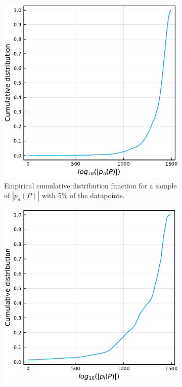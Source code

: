 \documentclass[12pt]{article}
\newcommand{\data}{d}
\newcommand{\pred}{p}
\newcommand{\paths}{P}
\theoremstyle{definition}
\begin{document}
\begin{figure}
  \centering
  \begin{subfigure}[t]{0.49\textwidth}
    \includegraphics[width=\textwidth]{figures/numpaths_measurements_cumulative.pdf}
    \caption{Empirical cumulative distribution function for a sample
      of \(|\pred_{\data}(\paths)|\) with 5\% of the datapoints.}
    \label{fig:numpaths-measurements-cumulative}
  \end{subfigure}
  \begin{subfigure}[t]{0.49\textwidth}
    \includegraphics[width=\textwidth]{figures/numpaths_startend_cumulative.pdf}

\end{subfigure}
\end{figure}
\end{document}
